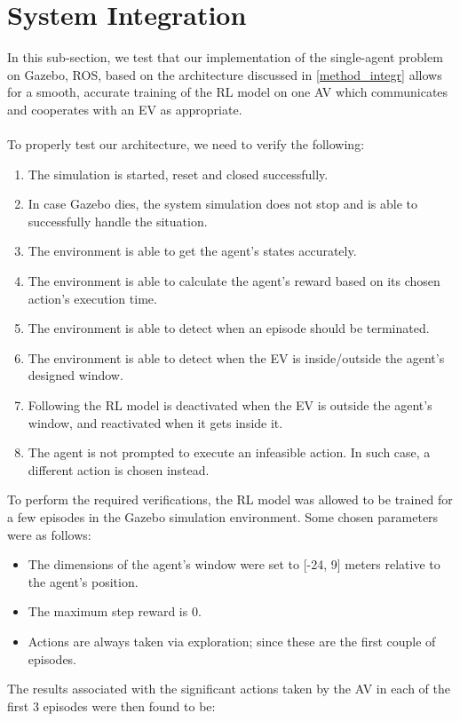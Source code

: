 \section{System Integration}
\label{test_final_int}
In this sub-section, we test that our implementation of the single-agent problem on Gazebo, ROS, based on the architecture discussed in \ref{method_integr} allows for a smooth, accurate training of the RL model on one AV which communicates and cooperates with an EV as appropriate. \\ \\
To properly test our architecture, we need to verify the following:
    \begin{enumerate}
    \item The simulation is started, reset and closed successfully.
    \item In case Gazebo dies, the system simulation does not stop and is able to successfully handle the situation.
    \item The environment is able to get the agent's states accurately.
    \item The environment is able to calculate the agent's reward based on its chosen action's execution time.
    \item The environment is able to detect when an episode should be terminated.
    \item The environment is able to detect when the EV is inside/outside the agent's designed window.
    \item Following the RL model is deactivated when the EV is outside the agent's window, and reactivated when it gets inside it.
    \item The agent is not prompted to execute an infeasible action. In such case, a different action is chosen instead.
    \end{enumerate}
To perform the required verifications, the RL model was allowed to be trained for a few episodes in the Gazebo simulation environment. Some chosen parameters were as follows:
\begin{itemize}
    \item The dimensions of the agent's window were set to [-24, 9] meters relative to the agent's position.
    \item The maximum step reward is 0.
    \item Actions are always taken via exploration; since these are the first couple of episodes.
\end{itemize}
The results associated with the significant actions taken by the AV in each of the first 3 episodes were then found to be:


